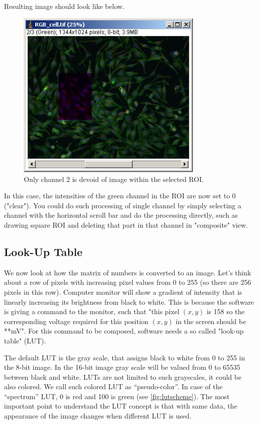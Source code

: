 \begin{indentexercise}{1}
Resulting image should look like below. 
\begin{figure}[H]
\begin{center}
\includegraphics[width=9cm]{fig/CMCIBasicCourse201102-img23.png}
\caption{ Only channel 2 is devoid of image within the selected ROI.}
\label{fig:img23}
\end{center}
\end{figure}

In this case, the intensities of the green channel in the ROI are now set to 0 ("clear"). You could do such
processing of single channel by simply selecting a channel with the horizontal scroll bar and do the processing directly, such as drawing square ROI and deleting that part in that channel in "composite" view. 
\end{indentexercise}

\subsection{Look-Up Table }
\label{subsec:LUT}

We now look at how the matrix of numbers is converted to an image. Let's think about 
a row of pixels with increasing pixel values from 0 to 255 (so there are 256 pixels in this row). 
Computer monitor will show a gradient of intensity that is linearly increasing its brightness 
from black to white. This is because the software is giving a command to the monitor, 
such that "this pixel $(x, y)$ is 158 so the corresponding voltage required for this position $(x, y)$ 
in the screen should be **mV". For this command to be composed, software needs a so called "look-up table" (LUT). 

The default LUT is the gray scale, that assigns black to white from 0 to 255 in the 8-bit image. In the 16-bit image gray scale will be valued from 0 to 65535 between black and white. LUTs are not limited to such grayscales, it could be also colored. We call such colored LUT as ``pseudo-color''. In case of the ``spectrum'' LUT, 0 is red and 100 is green  (see \ref{fig:lutscheme}). The most important point to understand the LUT concept is that with same data, the appearance of the image changes when different LUT is used.  

